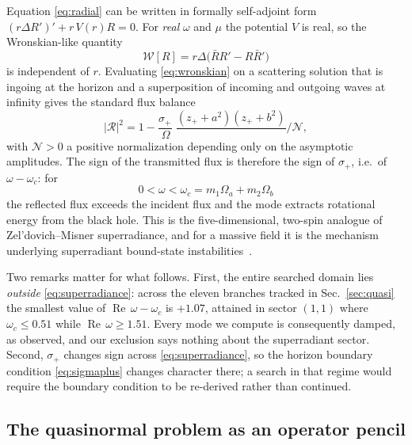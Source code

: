 \documentclass[aps,prd,reprint,superscriptaddress,nofootinbib,longbibliography]{revtex4-2}
\theoremstyle{plain}
\theoremstyle{definition}
\theoremstyle{remark}
\newcommand{\Rem}{\operatorname{Re}}
\begin{document}
Equation \eqref{eq:radial} can be written in formally self-adjoint form
$(r\Delta R')'+r\,V(r)R=0$. For \emph{real} $\omega$ and $\mu$ the potential $V$
is real, so the Wronskian-like quantity
\begin{equation}\label{eq:wronskian}
  \mathcal{W}[R] = r\Delta\big(\bar R R' - R\bar R'\big)
\end{equation}
is independent of $r$. Evaluating \eqref{eq:wronskian} on a scattering solution
that is ingoing at the horizon and a superposition of incoming and outgoing
waves at infinity gives the standard flux balance
\begin{equation}\label{eq:fluxbalance}
  |\mathcal{R}|^2 = 1 - \frac{\sigma_+}{\;\Omega\,}\;
  \frac{(z_++a^2)(z_++b^2)}{\;\;}\Big/ \mathcal{N},
\end{equation}
with $\mathcal{N}>0$ a positive normalization depending only on the asymptotic
amplitudes. The sign of the transmitted flux is therefore the sign of
$\sigma_+$, i.e.\ of $\omega-\omega_c$: for
\begin{equation}\label{eq:superradiance}
  0 < \omega < \omega_c = m_1\Omega_a+m_2\Omega_b
\end{equation}
the reflected flux exceeds the incident flux and the mode extracts rotational
energy from the black hole. This is the five-dimensional, two-spin analogue of
Zel'dovich--Misner superradiance, and for a massive field it is the mechanism
underlying superradiant bound-state
instabilities~\cite{Ponglertsakul2020A12,Lietal2023A15}.

Two remarks matter for what follows. First, the entire searched domain lies
\emph{outside} \eqref{eq:superradiance}: across the eleven branches tracked in
Sec.~\ref{sec:quasi} the smallest value of $\Rem\,\omega-\omega_c$ is $+1.07$,
attained in sector $(1,1)$ where $\omega_c\le0.51$ while
$\Rem\,\omega\ge1.51$. Every mode we compute is consequently damped, as
observed, and our exclusion says nothing about the superradiant sector. Second,
$\sigma_+$ changes sign across \eqref{eq:superradiance}, so the horizon boundary
condition \eqref{eq:sigmaplus} changes character there; a search in that regime
would require the boundary condition to be re-derived rather than continued.

\subsection{The quasinormal problem as an operator pencil}
\label{sec:sep:pencil}
\end{document}
